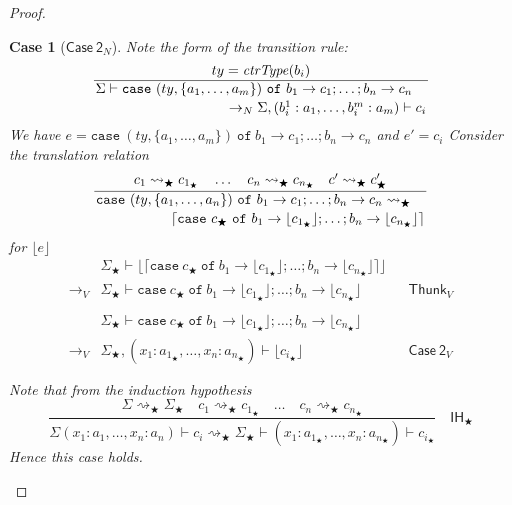 \documentclass[float=false, crop=false]{standalone}
\newtheorem{case}{Case}
\numberwithin{subcase}{case}
\newcommand{\tlang}{\bigstar}
\newcommand{\thunk}[1]{\lceil #1 \rceil}
\newcommand{\unwrap}[1]{\lfloor #1 \rfloor}
\newcommand{\tcbn}{\rightarrow_N}
\newcommand{\tcbv}{\rightarrow_V}
\newcommand{\tlthunk}{\rightsquigarrow_\tlang}
\begin{document}
\begin{proof}
\begin{case}[$\mathsf{Case\ 2}_N$]
  Note the form of the transition rule:
  \[ \dfrac{ty = \mathit{ctrType}(b_i)}{\splitdfrac{\Sigma \vdash 
  \mathtt{case}\ (ty,\{a_1,\dotsc,a_m\}) \ \mathtt{of}\ b_1 \rightarrow c_1; \dots; b_n \rightarrow c_n}
  {\tcbn \Sigma,(b_i^1:a_1,\dotsc,b_i^m:a_m) \vdash c_i}} \]
  We have $e = 
  \mathtt{case}\ (ty,\{a_1,\dotsc,a_m\}) \ \mathtt{of}\ b_1 \rightarrow c_1;
  \dots; b_n \rightarrow c_n$ and
  $e' = c_i$
  Consider the translation relation
  \[ \dfrac{c_1  \tlthunk c_{1_\tlang} \quad \dots \quad c_n \tlthunk c_{n_\tlang} 
      \quad c' \tlthunk c'_\tlang}
  {\splitdfrac{\mathtt{case}\ (ty,\{a_1,\dotsc,a_n\})\ \mathtt{of}\ 
      b_1 \rightarrow c_1; \dots; b_n \rightarrow c_n \tlthunk}
  {\thunk{\mathtt{case}\ c_\tlang\ \mathtt{of}\ b_1 \rightarrow \unwrap{c_{1_\tlang}}; 
      \dots; b_n \rightarrow \unwrap{c_{n_\tlang}}}}} \]
  for $\unwrap{e}$
  \begin{align*} 
  &\Sigma_\tlang \vdash \unwrap{\thunk{\mathtt{case}\ c_\tlang\ 
      \mathtt{of}\ b_1 \rightarrow \unwrap{c_{1_\tlang}}; 
      \dots; b_n \rightarrow \unwrap{c_{n_\tlang}}}}\\ \tcbv 
  &\Sigma_\tlang \vdash
  \mathtt{case}\ c_\tlang\ \mathtt{of}\ b_1 \rightarrow \unwrap{c_{1_\tlang}};  
      \dots; b_n \rightarrow \unwrap{c_{n_\tlang}} && \mathsf{Thunk}_V\\ \\
 & \Sigma_\tlang \vdash  \mathtt{case}\ c_\tlang\ \mathtt{of}\ b_1 \rightarrow \unwrap{c_{1_\tlang}};  
      \dots; b_n \rightarrow \unwrap{c_{n_\tlang}}\\ \tcbv
      &\Sigma_\tlang,(x_1:a_{1_\tlang},\dotsc,x_n:a_{n_\tlang}) \vdash \unwrap{c_{i_\tlang}}
      &&\mathsf{Case\ 2}_V\\ \\
\end{align*}
  Note that from the induction hypothesis
  \[ \frac{\Sigma \tlthunk \Sigma_\tlang \quad c_1 \tlthunk c_{1_\tlang} \quad \dots \quad
    c_n \tlthunk c_{n_\tlang}}{\Sigma (x_1:a_1,\dotsc,x_n:a_n) \vdash c_i \tlthunk \Sigma_\tlang \vdash 
    (x_1:a_{1_\tlang},\dotsc,x_n:a_{n_\tlang}) \vdash c_{i_\tlang}} \quad 
  \mathsf{IH}_\tlang\]
Hence this case holds.
\end{case}

\end{proof}
\end{document}
